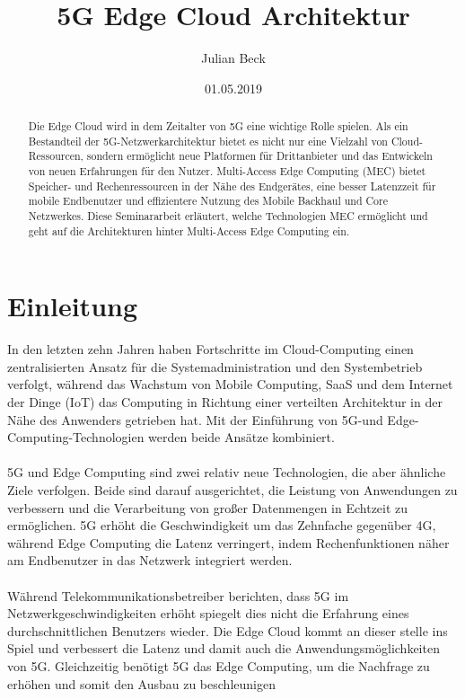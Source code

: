 \documentclass[runningheads]{llncs}
\title{5G Edge Cloud Architektur}
\author{Julian Beck}
\institute{Betreuer: Prof. Dr. rer. nat. Oliver Waldhorst}
\date{01.05.2019}
\numberwithin{figure}{section}
\begin{document}
\let\oldaddcontentsline\addcontentsline
\def\addcontentsline#1#2#3{}
\maketitle
\def\addcontentsline#1#2#3{\oldaddcontentsline{#1}{#2}{#3}}



\begin{abstract}
  Die Edge Cloud wird in dem Zeitalter von 5G eine wichtige Rolle spielen. 
  Als ein Bestandteil der 5G-Netzwerkarchitektur bietet es nicht nur eine Vielzahl von Cloud-Ressourcen, sondern
  ermöglicht neue Platformen für Drittanbieter und das Entwickeln von neuen Erfahrungen für den Nutzer.
  Multi-Access Edge Computing (MEC) bietet Speicher- und Rechenressourcen in der Nähe des Endgerätes, 
  eine besser Latenzzeit für mobile Endbenutzer und effizientere Nutzung des Mobile Backhaul
  und Core Netzwerkes. Diese Seminararbeit erläutert, welche Technologien MEC ermöglicht und geht auf die Architekturen 
  hinter Multi-Access Edge Computing ein.
\end{abstract}

\tableofcontents 
\newpage

\section{Einleitung}
\label{sec:Einleitung}
In den letzten zehn Jahren haben Fortschritte im Cloud-Computing einen zentralisierten Ansatz für die Systemadministration und den 
Systembetrieb verfolgt, während das Wachstum von Mobile Computing, 
SaaS und dem Internet der Dinge (IoT) das Computing in Richtung einer verteilten Architektur in der Nähe des Anwenders getrieben hat. 
Mit der Einführung von 5G-und Edge-Computing-Technologien werden beide Ansätze kombiniert.
\\
\\
5G und Edge Computing sind zwei relativ neue Technologien, die aber ähnliche Ziele verfolgen. 
Beide sind darauf ausgerichtet, die Leistung von Anwendungen zu verbessern 
und die Verarbeitung von großer Datenmengen in Echtzeit zu ermöglichen. 
5G erhöht die Geschwindigkeit um das Zehnfache gegenüber 4G, 
während  Edge Computing die Latenz verringert, indem Rechenfunktionen näher am Endbenutzer in das Netzwerk integriert werden.
\\
\\
Während Telekommunikationsbetreiber berichten, 
dass 5G im Netzwerkgeschwindigkeiten erhöht
spiegelt dies nicht die Erfahrung eines durchschnittlichen Benutzers wieder. 
Die Edge Cloud kommt an dieser stelle ins Spiel und verbessert die Latenz und 
damit auch die Anwendungsmöglichkeiten von 5G.
Gleichzeitig benötigt 5G das Edge Computing, um die Nachfrage zu erhöhen und somit den Ausbau zu beschleunigen
\end{document}
